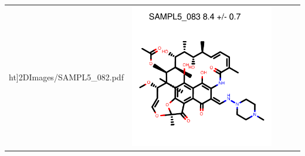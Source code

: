 \begin{tabular}{c c c c c}
ht]{2DImages/SAMPL5_082.pdf} & \includegraphics[height = 0.10\textheight]{2DImages/SAMPL5_083.pdf} \\ 

\end{tabular}
